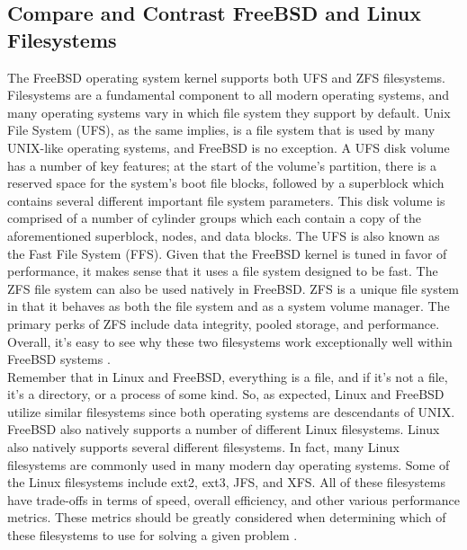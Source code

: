 \documentclass[onecolumn, draftclsnofoot,10pt, compsoc]{IEEEtran}
\begin{document}
\subsection{Compare and Contrast FreeBSD and Linux Filesystems}
\noindent The FreeBSD operating system kernel supports both UFS and ZFS filesystems. Filesystems are a fundamental component to all modern operating systems, and many operating systems vary in which file system they support by default. Unix File System (UFS), as the same implies, is a file system that is used by many UNIX-like operating systems, and FreeBSD is no exception. A UFS disk volume has a number of key features; at the start of the volume’s partition, there is a reserved space for the system’s boot file blocks, followed by a superblock which contains several different important file system parameters. This disk volume is comprised of a number of cylinder groups which each contain a copy of the aforementioned superblock, nodes, and data blocks. The UFS is also known as the Fast File System (FFS). Given that the FreeBSD kernel is tuned in favor of performance, it makes sense that it uses a file system designed to be fast. The ZFS file system can also be used natively in FreeBSD. ZFS is a unique file system in that it behaves as both the file system and as a system volume manager. The primary perks of ZFS include data integrity, pooled storage, and performance. Overall, it’s easy to see why these two filesystems work exceptionally well within FreeBSD systems \cite{FreeBSD1FS} \cite{FreeBSD2FS} \cite{FreeBSD3FS}.\\

\noindent Remember that in Linux and FreeBSD, everything is a file, and if it’s not a file, it’s a directory, or a process of some kind. So, as expected, Linux and FreeBSD utilize similar filesystems since both operating systems are descendants of UNIX.  FreeBSD also natively supports a number of different Linux filesystems. Linux also natively supports several different filesystems. In fact, many Linux filesystems are commonly used in many modern day operating systems. Some of the Linux filesystems include ext2, ext3, JFS, and XFS. All of these filesystems have trade-offs in terms of speed, overall efficiency, and other various performance metrics. These metrics should be greatly considered when determining which of these filesystems to use for solving a given problem \cite{Linux1FS} \cite{Linux2FS}.\\
\end{document}
